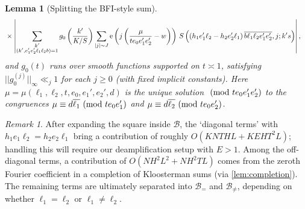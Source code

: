 \documentclass[reqno,11pt]{amsart}
\newtheorem{lemma}[theorem]{Lemma}
\theoremstyle{definition}
\theoremstyle{remark}
\newtheorem*{remark}{Remark}
\numberwithin{equation}{section}
\newcommand{\mB}{\mathcal{B}}
\newcommand{\e}{\textnormal{e}}
\renewcommand{\bar}{\overline}
\renewcommand{\pmod}[1]{\ (\textnormal{mod } #1)}
\begin{document}
\begin{lemma}[Splitting the BFI-style sum]
\[\begin{aligned}
    &\times 
    \left\vert 
    \sum_{\substack{k' \\ (k', e_1'e_2'\ell_1\ell_2b) = 1}} g_0 \left(\frac{k'}{K/S}\right)
    \sum_{|j| \sim J} \e\left(j \left(\frac{\mu}{te_0e_1'e_2'} - w\right)\right)\, 
    S\left( (h_1e_1'\ell_2 - h_2e_2'\ell_1)\, \bar{b \ell_1 \ell_2 e_1' e_2'}, j; k's\right)
    \right\vert,
\end{aligned}
\]
and $g_0(t)$ runs over smooth functions supported on $t \asymp 1$, satisfying $||g_0^{(j)}||_\infty \ll_j 1$ for each $j \ge 0$ (with fixed implicit constants). Here $\mu = \mu(\ell_1, \ell_2, t, e_0, e_1', e_2', d)$ is the unique solution $\pmod{te_0e_1'e_2'}$ to the congruences $\mu \equiv d\bar{\ell_1} \pmod{te_0e_1'}$ and $\mu \equiv d\bar{\ell_2} \pmod{te_0e_2'}$.
\end{lemma}

\begin{remark}
After expanding the square inside $\mB$, the `diagonal terms' with $h_1 e_1 \ell_2 = h_2 e_2 \ell_1$ bring a contribution of roughly $O(KNTHL + KEHT^2L)$; handling this will require our deamplification setup with $E > 1$. Among the off-diagonal terms, a contribution of $O(NH^2L^2 + NH^2TL)$ comes from the zeroth Fourier coefficient in a completion of Kloosterman sums (via \cref{lem:completion}). The remaining terms are ultimately separated into $\mB_=$ and $\mB_{\neq}$, depending on whether $\ell_1 = \ell_2$ or $\ell_1 \neq \ell_2$.
\end{remark}
\end{document}
